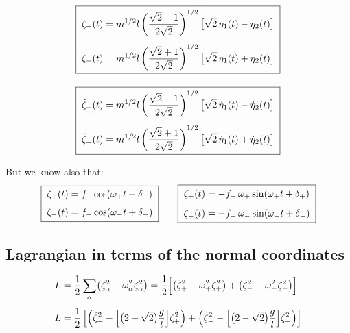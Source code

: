 \documentclass[11pt]{article}
\begin{document}
\begin{gather*}
  \boxed{\;
  \begin{aligned}
    \zeta_+(t) &= m^{1/2} l \left(\frac{\sqrt2-1}{2\sqrt2}\right)^{1/2}
                  \bigl[\sqrt2\,\eta_1(t) - \eta_2(t)\bigr]\\[4pt]
    \zeta_-(t) &= m^{1/2} l \left(\frac{\sqrt2+1}{2\sqrt2}\right)^{1/2}
                  \bigl[\sqrt2\,\eta_1(t) + \eta_2(t)\bigr]
  \end{aligned}\;}\\[10pt]
  \boxed{\;
  \begin{aligned}
    \dot\zeta_+(t) &= m^{1/2} l \left(\frac{\sqrt2-1}{2\sqrt2}\right)^{1/2}
                  \bigl[\sqrt2\,\dot\eta_1(t) - \dot\eta_2(t)\bigr]\\[4pt]
    \dot\zeta_-(t) &= m^{1/2} l \left(\frac{\sqrt2+1}{2\sqrt2}\right)^{1/2}
                  \bigl[\sqrt2\,\dot\eta_1(t) + \dot\eta_2(t)\bigr]
  \end{aligned}\;}
\end{gather*}

But we know also that:
\begin{gather*}
  \boxed{\;
  \begin{aligned}
    \zeta_+(t) &= f_+\cos(\omega_+ t + \delta_+)\\[4pt]
    \zeta_-(t) &= f_-\cos(\omega_- t + \delta_-)
  \end{aligned}\;}
  \qquad
  \boxed{\;
  \begin{aligned}
    \dot\zeta_+(t) &= -f_+\,\omega_+\sin(\omega_+ t + \delta_+)\\[4pt]
    \dot\zeta_-(t) &= -f_-\,\omega_-\sin(\omega_- t + \delta_-)
  \end{aligned}\;}
\end{gather*}

\subsection*{Lagrangian in terms of the normal coordinates}

\begin{align*}
  L &= \frac{1}{2}\sum_\alpha\bigl(\dot\zeta_\alpha^2 - \omega_\alpha^2\zeta_\alpha^2\bigr)
     = \frac{1}{2}\Bigl[\bigl(\dot\zeta_+^2 - \omega_+^2\zeta_+^2\bigr)
                      + \bigl(\dot\zeta_-^2 - \omega_-^2\zeta_-^2\bigr)\Bigr]\\[4pt]
  L &= \frac{1}{2}\left[\left(\dot\zeta_+^2 - \Bigl[\bigl(2+\sqrt2\bigr)\frac{g}{l}\Bigr]\zeta_+^2\right)
      + \left(\dot\zeta_-^2 - \Bigl[\bigl(2-\sqrt2\bigr)\frac{g}{l}\Bigr]\zeta_-^2\right)\right]
\end{align*}
\end{document}
